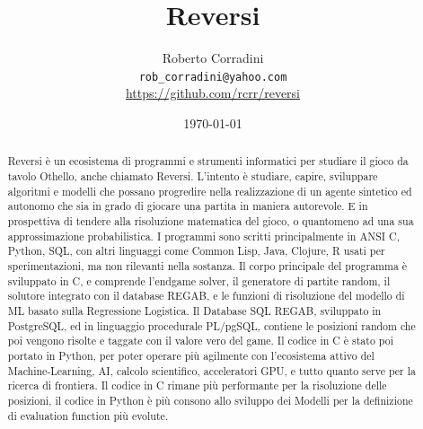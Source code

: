 \documentclass{article}
\title{Reversi}
\author{Roberto Corradini \\[0.2cm]
\small \texttt{rob\_corradini@yahoo.com} \\[0.1cm]
\url{https://github.com/rcrr/reversi}}
\date{\today}
\begin{document}
\maketitle
\vspace{1cm}
\begin{abstract}
\normalsize
Reversi è un ecosistema di programmi e strumenti informatici per studiare il gioco da tavolo Othello, anche chiamato Reversi.
L'intento è studiare, capire, sviluppare algoritmi e modelli che possano progredire nella realizzazione di un agente
sintetico ed autonomo che sia in grado di giocare una partita in maniera autorevole. E in prospettiva di tendere alla
risoluzione matematica del gioco, o quantomeno ad una sua approssimazione probabilistica.
I programmi sono scritti principalmente in ANSI C, Python, SQL, con altri linguaggi come Common Lisp, Java, Clojure, R usati
per sperimentazioni, ma non rilevanti nella sostanza.
Il corpo principale del programma è sviluppato in C, e comprende l'endgame solver, il generatore di partite random, il
solutore integrato con il database REGAB, e le funzioni di risoluzione del modello di ML basato sulla Regressione Logistica.
Il Database SQL REGAB, sviluppato in PostgreSQL, ed in linguaggio procedurale PL/pgSQL, contiene le posizioni random
che poi vengono risolte e taggate con il valore vero del game.
Il codice in C è stato poi portato in Python, per poter operare più agilmente con l'ecosistema attivo del Machine-Learning, AI,
calcolo scientifico, acceleratori GPU, e tutto quanto serve per la ricerca di frontiera.
Il codice in C rimane più performante per la risoluzione delle posizioni, il codice in Python è più consono allo sviluppo
dei Modelli per la definizione di evaluation function più evolute.
\end{abstract}










\appendix


\end{document}
